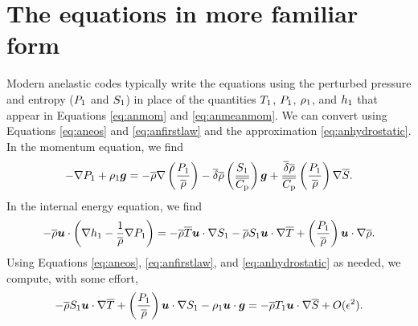\documentclass[12pt]{article}
\begin{document}
\section{The \citet{Gough1969} equations in more familiar form}
Modern anelastic codes typically write the equations using the perturbed pressure and entropy ($P_1$ and $S_1$) in place of the quantities $T_1$, $P_1$, $\rho_1$, and $h_1$ that appear in Equations \eqref{eq:anmom} and \eqref{eq:anmeanmom}. We can convert using Equations \eqref{eq:aneos} and \eqref{eq:anfirstlaw} and the approximation \eqref{eq:anhydrostatic}. In the momentum equation, we find
\begin{align}\label{eq:anrhsmom}
	-\nabla P_1 + \rho_1\bm{g} = -\overline{\rho}\nabla\left(\frac{P_1}{\overline{\rho}}\right) - \overline{\delta} \overline{\rho} \left(\frac{S_1}{\overline{C_{\rm{p}}}}\right) \bm{g} + \frac{\overline{\delta}\overline{\rho}}{\overline{C_{\rm{p}}}} \left(\frac{P_1}{\overline{\rho}}\right)\nabla\overline{S}.
\end{align}
In the internal energy equation, we find
\begin{align}\label{eq:anrhsen}
	-\overline{\rho}\bm{u}\cdot\left(\nabla h_1-\frac{1}{\overline{\rho}}\nabla P_1\right) = -\overline{\rho}\overline{T}\bm{u}\cdot\nabla S_1 - \overline{\rho} S_1\bm{u}\cdot\nabla\overline{T} + \left(\frac{P_1}{\overline{\rho}}\right)\bm{u}\cdot\nabla \overline{\rho}.
\end{align}
Using Equations \eqref{eq:aneos}, \eqref{eq:anfirstlaw}, and \eqref{eq:anhydrostatic} as needed, we compute, with some effort,
\begin{align}\label{eq:anrhsen2}
	- \overline{\rho} S_1\bm{u}\cdot\nabla\overline{T} + \left(\frac{P_1}{\overline{\rho}}\right)\bm{u}\cdot\nabla S_1 -\rho_1\bm{u}\cdot\bm{g} = -\overline{\rho} T_1\bm{u}\cdot\nabla\overline{S} + O(\epsilon^2).
\end{align}
\end{document}
